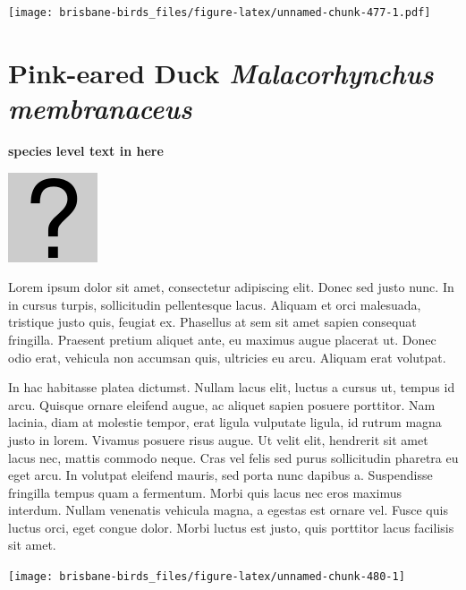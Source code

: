 \documentclass[]{book}
\let\origfigure\figure
\let\endorigfigure\endfigure
\renewenvironment{figure}[1][2] {
  \expandafter\origfigure\expandafter[H]
} {
  \endorigfigure
}
\begin{document}
\begin{figure}
\centering
\texttt{[image: brisbane-birds\_files/figure-latex/unnamed-chunk-477-1.pdf]}
\caption{\label{fig:unnamed-chunk-477}insert figure caption}
\end{figure}

\section{\texorpdfstring{Pink-eared Duck \emph{Malacorhynchus
membranaceus}}{Pink-eared Duck Malacorhynchus membranaceus}}\label{pink-eared-duck-malacorhynchus-membranaceus}

\textbf{species level text in here}

\begin{figure}
\centering
\includegraphics{assets/missing.png}
\caption{No image for species}
\end{figure}

Lorem ipsum dolor sit amet, consectetur adipiscing elit. Donec sed justo
nunc. In in cursus turpis, sollicitudin pellentesque lacus. Aliquam et
orci malesuada, tristique justo quis, feugiat ex. Phasellus at sem sit
amet sapien consequat fringilla. Praesent pretium aliquet ante, eu
maximus augue placerat ut. Donec odio erat, vehicula non accumsan quis,
ultricies eu arcu. Aliquam erat volutpat.

In hac habitasse platea dictumst. Nullam lacus elit, luctus a cursus ut,
tempus id arcu. Quisque ornare eleifend augue, ac aliquet sapien posuere
porttitor. Nam lacinia, diam at molestie tempor, erat ligula vulputate
ligula, id rutrum magna justo in lorem. Vivamus posuere risus augue. Ut
velit elit, hendrerit sit amet lacus nec, mattis commodo neque. Cras vel
felis sed purus sollicitudin pharetra eu eget arcu. In volutpat eleifend
mauris, sed porta nunc dapibus a. Suspendisse fringilla tempus quam a
fermentum. Morbi quis lacus nec eros maximus interdum. Nullam venenatis
vehicula magna, a egestas est ornare vel. Fusce quis luctus orci, eget
congue dolor. Morbi luctus est justo, quis porttitor lacus facilisis sit
amet.

\begin{figure}
\texttt{[image: brisbane-birds\_files/figure-latex/unnamed-chunk-480-1]} \caption{insert figure caption}\label{fig:unnamed-chunk-480}
\end{figure}
\end{document}
